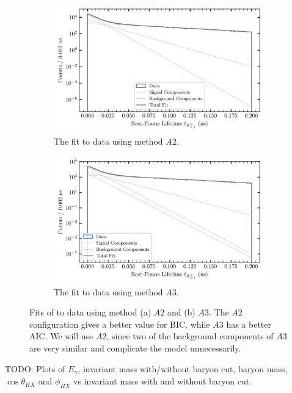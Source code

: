 \begin{figure}
  \begin{center}
    \begin{subfigure}[t]{\textwidth}
        \begin{center}
          \includegraphics[width=.8\columnwidth]{figures/splot_fit_data_chisqdof_3.4_splot_D_1s_2b.png}
        \caption{The fit to data using method $A2$.}
        \end{center}
        \end{subfigure}
        \begin{subfigure}[t]{\textwidth}
          \begin{center}
            \includegraphics[width=.8\columnwidth]{figures/splot_fit_data_chisqdof_3.4_splot_D_1s_3b.png}
        \caption{The fit to data using method $A3$.}
          \end{center}
        \end{subfigure}
        \caption{Fits of  to data using method (a) $A2$ and (b) $A3$. The $A2$ configuration gives a better value for BIC, while $A3$ has a better AIC. We will use $A2$, since two of the background components of $A3$ are very similar and complicate the model unnecessarily.}\label{fig:splot-A2-A3}
\end{center}
\end{figure}

{\color{red}TODO: Plots of $E_\gamma$, invariant mass with/without baryon cut, baryon mass, $\cos\theta_{HX}$ and $\phi_{HX}$ vs invariant mass with and without baryon cut.}
